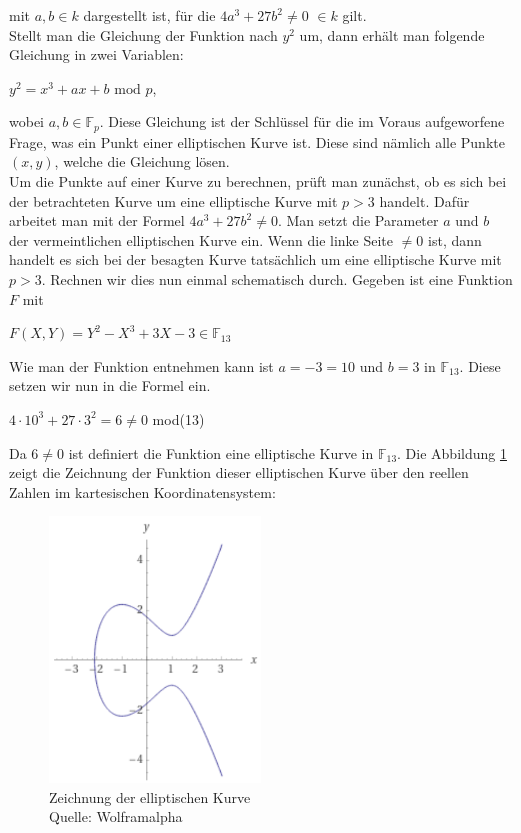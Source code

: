 mit $a, b \in k$ dargestellt ist, für die $4a^3 + 27b^2 \neq 0$  $\in k$ gilt.\\

Stellt man die Gleichung der Funktion nach $y^{2}$ um, dann erhält man folgende Gleichung in zwei Variablen:
\begin{center}
$y^{2} =  x^{3} + ax + b  \text{ mod } p$,
\end{center}

wobei $a, b \in \mathbb{F}_p$. Diese Gleichung ist der Schlüssel für die im Voraus aufgeworfene Frage, was ein Punkt einer elliptischen Kurve ist. Diese sind nämlich alle Punkte $(x, y)$, welche die Gleichung lösen.\\

Um die Punkte auf einer Kurve zu berechnen, prüft man zunächst, ob es sich bei der betrachteten Kurve um eine elliptische Kurve mit $p > 3$ handelt. Dafür arbeitet man mit der Formel  $4a^3 + 27b^2 \neq 0$. Man setzt die Parameter $a$ und $b$ der vermeintlichen elliptischen Kurve ein. Wenn die linke Seite $\neq 0$ ist, dann handelt es sich bei der besagten Kurve tatsächlich um eine elliptische Kurve mit $p > 3$. Rechnen wir dies nun einmal schematisch durch. Gegeben ist eine Funktion $F$ mit
\begin{center}
$F(X, Y) = Y^{2} - X^{3} + 3X - 3 \in \mathbb{F}_{13}$
\end{center} 

Wie man der Funktion entnehmen kann ist $a = - 3 = 10$ und $b = 3$ in $\mathbb{F}_{13}$. Diese setzen wir nun in die Formel ein.
\begin{center}
$4 \cdot 10^3 + 27 \cdot 3^2 = 6 \neq 0$ mod(13)
\end{center} 

Da $6 \neq 0$ ist definiert die Funktion eine elliptische Kurve in $\mathbb{F}_{13}$. Die Abbildung \ref{fig:kurve_beispiel_1_punktberechnung} zeigt die Zeichnung der Funktion dieser elliptischen Kurve über den reellen Zahlen im kartesischen Koordinatensystem: 

\begin{figure}[H]
    \centering
    \includegraphics[width=0.5\textwidth]{grafiken/kurve_beispiel_1_punktberechnung.png}
    \caption[Zeichnung der elliptischen Kurve]{Zeichnung der elliptischen Kurve \\ Quelle: Wolframalpha}
    \label{fig:kurve_beispiel_1_punktberechnung}
\end{figure}

